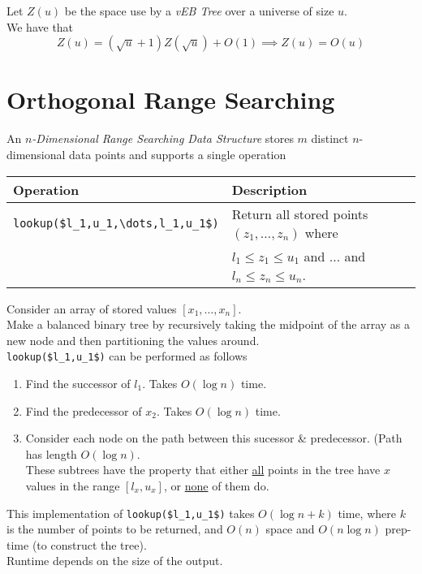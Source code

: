 \documentclass[11pt,a4paper]{article}
\begin{document}
Let $Z(u)$ be the space use by a \textit{vEB Tree} over a universe of size $u$.\\
We have that
$$Z(u)=(\sqrt{u}+1)Z(\sqrt{u})+O(1)\implies Z(u)=O(u)$$

\section{Orthogonal Range Searching}

An \textit{$n$-Dimensional Range Searching Data Structure} stores $m$ distinct $n$-dimensional data points and supports a single operation
\begin{center}
\begin{tabular}{l|l}
\textbf{Operation}&\textbf{Description}\\\hline
\lstinline!lookup($l_1,u_1,\dots,l_1,u_1$)!&Return all stored points $(z_1,\dots,z_n)$ where\\
&$l_1\leq z_1\leq u_1$ and $\dots$ and $l_n\leq z_n\leq u_n$.
\end{tabular}
\end{center}

Consider an array of stored values $[x_1,\dots,x_n]$.\\
Make a balanced binary tree by recursively taking the midpoint of the array as a new node and then partitioning the values around.\\
\lstinline!lookup($l_1,u_1$)! can be performed as follows
\begin{enumerate}
	\item Find the successor of $l_1$. Takes $O(\log n)$ time.
	\item Find the predecessor of $x_2$. Takes $O(\log n)$ time.
	\item Consider each node on the path between this sucessor \& predecessor. (Path has length $O(\log n)$.\\
	These subtrees have the property that either \underline{all} points in the tree have $x$ values in the range $[l_x,u_x]$, or \underline{none} of them do.
\end{enumerate}
This implementation of \lstinline!lookup($l_1,u_1$)! takes $O(\log n+k)$ time, where $k$ is the number of points to be returned, and $O(n)$ space and $O(n\log n)$ prep-time (to construct the tree).\\
\nb Runtime depends on the size of the output.\\
\end{document}
